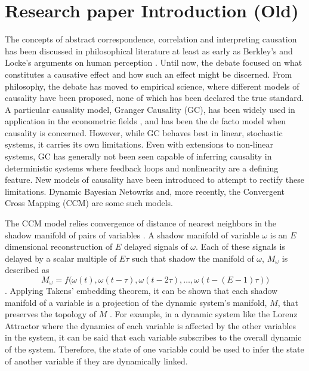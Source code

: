 \documentclass[journal,12pt,onecolumn,draftclsnofoot]{IEEEtran}  %
\begin{document}
\section{Research paper Introduction (Old)}
The concepts of abstract correspondence, correlation and interpreting causation has been discussed in philosophical literature at least as early as Berkley's and Locke's arguments on human perception \cite{Locke1841} \cite{Berkeley1874}. Until now, the debate focused on what constitutes a causative effect and how such an effect might be discerned. From philosophy, the debate has moved to empirical science, where different models of causality have been proposed, none of which has been declared the true standard. A particular causality model, Granger Causality (GC), has been widely used in application in the econometric fields \cite{Granger1969}, and has been the de facto model when causality is concerned. However, while GC behaves best in linear, stochastic systems, it carries its own limitations. Even with extensions to non-linear systems, GC has generally not been seen capable of inferring causality in deterministic systems where feedback loops and nonlinearity are a defining feature. New models of causality have been introduced to attempt to rectify these limitations. Dynamic Bayesian Netowrks and, more recently, the Convergent Cross Mapping (CCM) are some such models. 

The CCM model relies convergence of distance of nearest neighbors in the shadow manifold of pairs of variables \cite{Sugihara2012}. A shadow manifold of variable $\omega$ is an $E$ dimensional reconstruction of $E$ delayed signals of $\omega$. Each of these signals is delayed by a scalar multiple of $E\tau$ such that shadow the manifold of $\omega$, $M_{\omega}$ is described as 
$$M_{\omega} = f\Big(\omega(t), \omega(t-\tau), \omega(t-2\tau), \dots, \omega(t-(E-1)\tau)\Big)$$.
Applying Takens' embedding theorem, it can be shown that each shadow manifold of a variable is a projection of the dynamic system's manifold, $M$, that preserves the topology of $M$ \cite{Dixon1999,Deyle2011,Takens1981}. For example, in a dynamic system like the Lorenz Attractor where the dynamics of each variable is affected by the other variables in the system, it can be said that each variable subscribes to the overall dynamic of the system. Therefore, the state of one variable could be used to infer the state of another variable if they are dynamically linked. 
\end{document}

